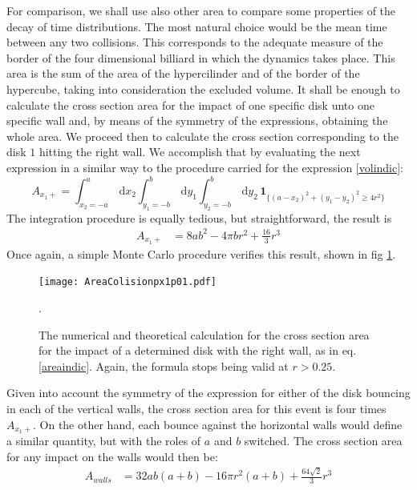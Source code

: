 \documentclass[a4paper,10pt, jcp, aps, preprint]{revtex4-1}
\newcommand{\rd}{\, \mathrm{d}}
\newcommand{\indicator}[1]{\mathbf{1}_{ \{   #1 \} } }
\begin{document}
For comparison, we shall use also other area to compare
some properties of the decay of time distributions. The most natural choice
would be the mean time between any two collisions. This corresponds
to the adequate measure of the border of the four dimensional
billiard in which the dynamics takes place. This area is
the sum of the area of the hypercilinder and of the border of the
hypercube, taking into consideration the excluded volume. 
It shall be enough to calculate the cross section area for
the impact of one specific disk unto one specific wall and,
by means of the symmetry of the expressions, obtaining the whole
area. We proceed then to calculate the cross section corresponding to 
the disk $1$ hitting the right wall. We accomplish that by
evaluating the next expression in a similar way to
the procedure carried for the expression \ref{volindic}:
\begin{equation}\label{areaindic}
 A_{x_1+} =  \int_{x_2 = -a}^a \rd x_2 
\int_{y_1 = -b}^b \rd y_1 \int_{y_2 = -b}^b \rd y_2 \, \indicator{ (a-x_2)^2 + (y_1-y_2)^2 \ge 4 r^2 }
\end{equation}
The integration procedure is equally tedious, but
straightforward, the result is 
\begin{align}\label{areax1p}
 A_{x_1+} & = 8 a b^2-4  \pi b r^2 +\frac{16}{3}r^3 
\end{align}
Once again, a simple Monte Carlo procedure verifies this result,
shown in fig \ref{area1derecha}. 

\begin{figure}
\centering
\texttt{[image: AreaColisionpx1p01.pdf]}
\caption{The numerical and theoretical calculation for the cross section area
for the impact of a determined disk with the right wall, as in eq. \ref{areaindic}.
Again, the formula stops being valid at $r>0.25$. }
\label{area1derecha}.
\end{figure}

Given into account the symmetry of the expression for either of 
the disk bouncing in each of the vertical walls, the
cross section area for this event is four times $A_{x_1+}$. On
the other hand, each bounce against the horizontal walls would
define a similar quantity, but with the roles of $a$ and $b$ switched.
The cross section area for any impact on the walls would then be:
\begin{align}\label{areawalls}
 A_{walls} & = 32 a b (a+b)-16 \pi r^2 (a+b) +\frac{64\sqrt{2}}{3}r^3 
\end{align}
\end{document}
